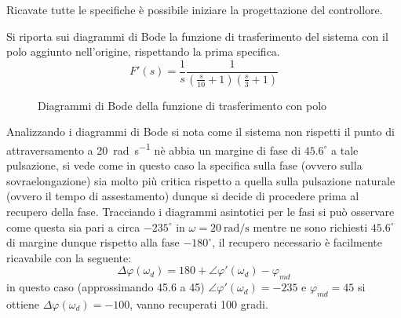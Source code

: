 Ricavate tutte le specifiche è possibile iniziare la progettazione del controllore.

Si riporta sui diagrammi di Bode la funzione di trasferimento del sistema con
il polo aggiunto nell'origine, rispettando la prima specifica.
$$
    F'(s) = \frac{1}{s}\frac{1}{\left(\frac{s}{10}+1\right)\left(\frac{s}{3}+1\right)}
$$

\begin{figure}[h]
    \centering
    \caption{Diagrammi di Bode della funzione di trasferimento con polo}
    \label{fig:bode_es_2}
\end{figure}

Analizzando i diagrammi di Bode si nota come il sistema non rispetti il punto
di attraversamento a \SI{20}{\radian\per\second} nè abbia un margine di fase
di $45.6^\circ$ a tale pulsazione, si vede come in questo caso la specifica sulla fase (ovvero sulla sovraelongazione) sia molto più critica rispetto a quella sulla pulsazione naturale (ovvero il tempo di assestamento) dunque si decide di procedere prima al recupero della fase.
Tracciando i diagrammi asintotici per le fasi si può osservare come questa sia pari a circa $-235^\circ$ in $\omega=\SI{20}{\radian/\second}$ mentre ne sono richiesti $45.6^\circ$ di margine dunque rispetto alla fase $-180^\circ$, il recupero necessario è facilmente ricavabile con la seguente:
$$
    \Delta\varphi(\omega_d) = 180 + \angle{\varphi'(\omega_d)} - \varphi_{md}
$$
in questo caso (approssimando 45.6 a 45) $\angle{\varphi'(\omega_d)} = -235$ e $\varphi_{md} = 45$ si ottiene $\Delta\varphi(\omega_d) = -100$, vanno recuperati 100 gradi.

